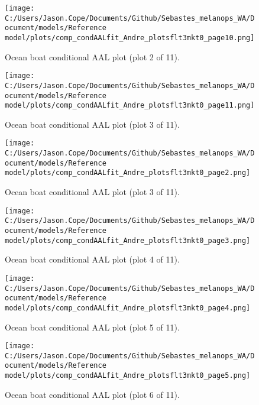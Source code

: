 \documentclass[11pt,
  letterpaper,
]{article}
\begin{document}
\begin{figure}
{\centering
\texttt{[image: C:/Users/Jason.Cope/Documents/Github/Sebastes\_melanops\_WA/Document/models/Reference model/plots/comp\_condAALfit\_Andre\_plotsflt3mkt0\_page10.png]}
}
\caption{Ocean boat conditional AAL plot (plot 2 of 11).\label{fig:comp_condAALfit_Andre_plotsflt3mkt0_page10}}
\end{figure}

\begin{figure}
{\centering
\texttt{[image: C:/Users/Jason.Cope/Documents/Github/Sebastes\_melanops\_WA/Document/models/Reference model/plots/comp\_condAALfit\_Andre\_plotsflt3mkt0\_page11.png]}
}
\caption{Ocean boat conditional AAL plot (plot 3 of 11).\label{fig:comp_condAALfit_Andre_plotsflt3mkt0_page11}}
\end{figure}

\begin{figure}
{\centering
\texttt{[image: C:/Users/Jason.Cope/Documents/Github/Sebastes\_melanops\_WA/Document/models/Reference model/plots/comp\_condAALfit\_Andre\_plotsflt3mkt0\_page2.png]}
}
\caption{Ocean boat conditional AAL plot (plot 3 of 11).\label{fig:comp_condAALfit_Andre_plotsflt3mkt0_page2}}
\end{figure}

\begin{figure}
{\centering
\texttt{[image: C:/Users/Jason.Cope/Documents/Github/Sebastes\_melanops\_WA/Document/models/Reference model/plots/comp\_condAALfit\_Andre\_plotsflt3mkt0\_page3.png]}
}
\caption{Ocean boat conditional AAL plot (plot 4 of 11).\label{fig:comp_condAALfit_Andre_plotsflt3mkt0_page3}}
\end{figure}

\begin{figure}
{\centering
\texttt{[image: C:/Users/Jason.Cope/Documents/Github/Sebastes\_melanops\_WA/Document/models/Reference model/plots/comp\_condAALfit\_Andre\_plotsflt3mkt0\_page4.png]}
}
\caption{Ocean boat conditional AAL plot (plot 5 of 11).\label{fig:comp_condAALfit_Andre_plotsflt3mkt0_page4}}
\end{figure}

\begin{figure}
{\centering
\texttt{[image: C:/Users/Jason.Cope/Documents/Github/Sebastes\_melanops\_WA/Document/models/Reference model/plots/comp\_condAALfit\_Andre\_plotsflt3mkt0\_page5.png]}
}
\caption{Ocean boat conditional AAL plot (plot 6 of 11).\label{fig:comp_condAALfit_Andre_plotsflt3mkt0_page5}}
\end{figure}
\end{document}
